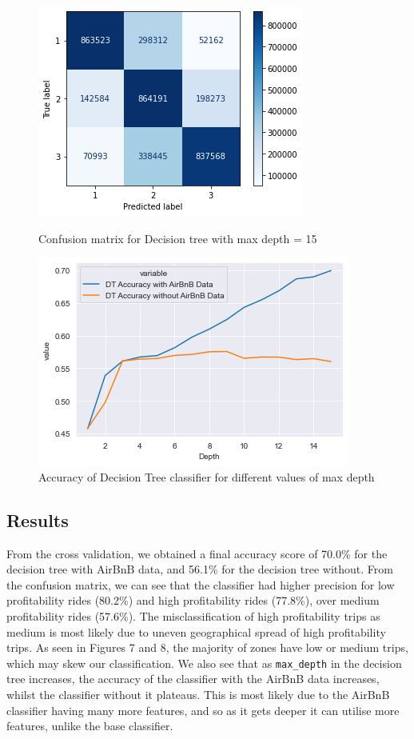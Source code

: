 \documentclass[11pt]{article}
\begin{document}
\begin{figure}[!htb]
\centering
\begin{minipage}[b]{0.45\linewidth}
\includegraphics[scale=0.6]{plots/error_matrix.png}
\caption{Confusion matrix for Decision tree with max depth = 15}
\label{fig:minipage1}
\end{minipage}
\hspace{10mm}%
\quad
\begin{minipage}[b]{0.45\linewidth}
\includegraphics[scale=0.6]{plots/DT_accuracy.png}
\caption{Accuracy of Decision Tree classifier for different values of max depth}
\label{fig:minipage2}
\end{minipage}
\end{figure}


\subsection{Results}
From the cross validation, we obtained a final accuracy score of 70.0\% for the decision tree with AirBnB data, and 56.1\% for the decision tree without. From the confusion matrix, we can see that the classifier had higher precision for low profitability rides (80.2\%) and high profitability rides (77.8\%), over medium profitability rides (57.6\%). The misclassification of high profitability trips as medium is most likely due to uneven geographical spread of high profitability trips. As seen in Figures 7 and 8, the majority of zones have low or medium trips, which may skew our classification. We also see that as \verb|max_depth| in the decision tree increases, the accuracy of the classifier with the AirBnB data increases, whilst the classifier without it plateaus. This is most likely due to the AirBnB classifier having many more features, and so as it gets deeper it can utilise more features, unlike the base classifier.
\end{document}
